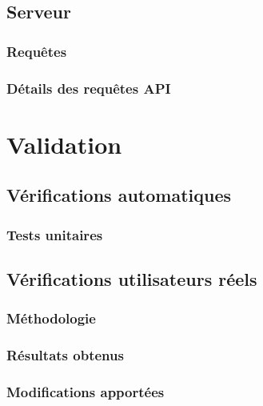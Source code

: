 \documentclass{EPL-master-thesis-covers-FR}
\begin{document}
				

			

		\section{Serveur}
			\label{sec:serveur}

		

			\subsection*{Requêtes}

			

			\subsection*{Détails des requêtes API}
				\label{sec:api}

			

	\chapter{Validation}


		\section{Vérifications automatiques}

			\subsection*{Tests unitaires}

			

		\section{Vérifications utilisateurs réels}


			\subsection*{Méthodologie}

				

			\subsection*{Résultats obtenus}

				

			\subsection*{Modifications apportées}
\end{document}
